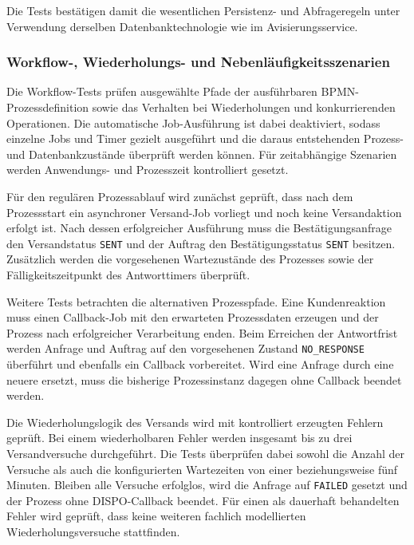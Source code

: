Die Tests bestätigen damit die wesentlichen Persistenz- und Abfrageregeln unter
Verwendung derselben Datenbanktechnologie wie im Avisierungsservice.

\subsubsection{Workflow-, Wiederholungs- und Nebenläufigkeitsszenarien}
\label{sec:test-workflow-wiederholung-nebenlaeufigkeit}

Die Workflow-Tests prüfen ausgewählte Pfade der ausführbaren
BPMN-Prozessdefinition sowie das Verhalten bei Wiederholungen und
konkurrierenden Operationen. Die automatische Job-Ausführung ist dabei
deaktiviert, sodass einzelne Jobs und Timer gezielt ausgeführt und die daraus
entstehenden Prozess- und Datenbankzustände überprüft werden können. Für
zeitabhängige Szenarien werden Anwendungs- und Prozesszeit kontrolliert gesetzt.

Für den regulären Prozessablauf wird zunächst geprüft, dass nach dem
Prozessstart ein asynchroner Versand-Job vorliegt und noch keine Versandaktion
erfolgt ist. Nach dessen erfolgreicher Ausführung muss die
Bestätigungsanfrage den Versandstatus \texttt{SENT} und der Auftrag den
Bestätigungsstatus \texttt{SENT} besitzen. Zusätzlich werden die vorgesehenen
Wartezustände des Prozesses sowie der Fälligkeitszeitpunkt des Antworttimers
überprüft.

Weitere Tests betrachten die alternativen Prozesspfade. Eine Kundenreaktion
muss einen Callback-Job mit den erwarteten Prozessdaten erzeugen und der Prozess
nach erfolgreicher Verarbeitung enden. Beim Erreichen der Antwortfrist werden
Anfrage und Auftrag auf den vorgesehenen Zustand \texttt{NO\_RESPONSE}
überführt und ebenfalls ein Callback vorbereitet. Wird eine Anfrage durch eine
neuere ersetzt, muss die bisherige Prozessinstanz dagegen ohne Callback beendet
werden.

Die Wiederholungslogik des Versands wird mit kontrolliert erzeugten Fehlern
geprüft. Bei einem wiederholbaren Fehler werden insgesamt bis zu drei
Versandversuche durchgeführt. Die Tests überprüfen dabei sowohl die Anzahl der
Versuche als auch die konfigurierten Wartezeiten von einer beziehungsweise fünf
Minuten. Bleiben alle Versuche erfolglos, wird die Anfrage auf \texttt{FAILED}
gesetzt und der Prozess ohne DISPO-Callback beendet. Für einen als dauerhaft
behandelten Fehler wird geprüft, dass keine weiteren fachlich modellierten
Wiederholungsversuche stattfinden.

